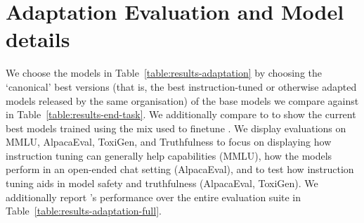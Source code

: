 \section{Adaptation Evaluation and Model details}
\label{app:adaptation-evals-description}
We choose the models in Table~\ref{table:results-adaptation} by choosing the `canonical' best versions (that is, the best instruction-tuned or otherwise adapted models released by the same organisation) of the base models we compare against in Table~\ref{table:results-end-task}. We additionally compare to  to show the current best models trained using the \tulu mix used to finetune \olmo. We display evaluations on MMLU, AlpacaEval, ToxiGen, and Truthfulness to focus on displaying how instruction tuning can generally help capabilities (MMLU), how the models perform in an open-ended chat setting (AlpacaEval), and to test how instruction tuning aids in model safety and truthfulness (AlpacaEval, ToxiGen). We additionally report \olmo's performance over the entire \tulu evaluation suite in Table~\ref{table:results-adaptation-full}.


\begin{table}[t]
\vspace{1em}
\caption{Evaluation of \model models before and after instruction finetuning and DPO training on the full \tulu evaluation suite. Lower is better for ToxiGen and higher is better for other metrics.}
\label{table:results-adaptation-full}
\end{table}

